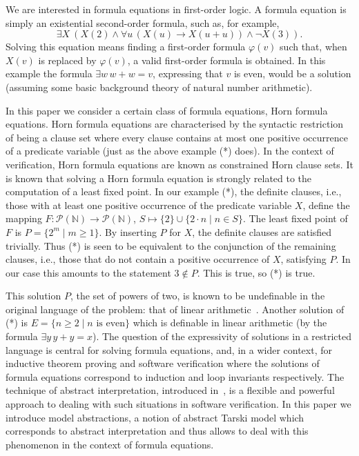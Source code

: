 \documentclass[acmsmall]{acmart}
\theoremstyle{plain}
\theoremstyle{definition}
\newcommand{\calC}{\mathcal{C}}
\renewcommand{\phi}{\varphi}
\newcommand{\Nat}{\mathbb{N}}
\newcommand{\powset}{\mathcal{P}}
\newcommand{\union}{\cup}
\newcommand{\impl}{\rightarrow} %
\begin{document}
We are interested in formula equations in first-order logic.
A formula equation is simply an existential second-order formula,
 such as, for example,
%
\begin{equation}\label{eq.runex}
\exists X\ ( X(2) \land \forall u\, (X(u) \impl X(u + u)) \land \neg X(3) ). \tag{*}
\end{equation}
%
Solving this equation means finding a first-order formula $\phi(v)$
 such that, when $X(v)$ is replaced by $\phi(v)$, a valid
 first-order formula is obtained.
In this example the formula $\exists w\, w+w = v$, expressing that
 $v$ is even, would be a solution (assuming some basic background theory of natural
 number arithmetic).

In this paper we consider a certain class of formula equations, Horn
 formula equations.
Horn formula equations are characterised by the syntactic restriction of
 being a clause set where every clause contains at most one positive
 occurrence of a predicate variable (just as the above example (*) does).
In the context of verification, Horn formula equations are known as constrained Horn clause sets.
It is known that solving a Horn formula equation is strongly related
 to the computation of a least fixed point.
In our example (*), the definite clauses, i.e., those with at least
 one positive occurrence of the predicate variable $X$, define the
 mapping $F:\powset(\Nat) \to \powset(\Nat)$,
 $S \mapsto \{ 2 \} \union \{ 2\cdot n \mid n \in S \}$.
The least fixed point of $F$ is $P = \{ 2^m \mid m \geq 1 \}$.
By inserting $P$ for $X$, the definite clauses are satisfied trivially.
Thus (*) is seen to be equivalent to the conjunction
 of the remaining clauses, i.e., those that do not contain a positive
 occurrence of $X$, satisfying $P$.
In our case this amounts to the statement $3 \notin P$.
This is true, so (*) is true.

This solution $P$, the set of powers of two, is known to be undefinable in
the original language of the problem: that of linear
 arithmetic~\cite{Enderton01Mathematical}.
Another solution of (*) is  $E = \{ n \geq 2 \mid \text{$n$ is even} \}$
 which is definable in linear arithmetic (by the formula $\exists y\, y + y = x$).
The question of the expressivity of solutions in a restricted language is central for
 solving formula equations, and, in a wider context, for inductive theorem proving
 and software verification where the solutions of formula equations correspond to
 induction and loop invariants respectively.
The technique of abstract interpretation, introduced in~\cite{Cousot77Abstract}, is a flexible
 and powerful approach to dealing with such situations in software verification.
In this paper we introduce model abstractions, a notion of abstract Tarski model which
 corresponds to abstract interpretation and thus allows to deal with this phenomenon
 in the context of formula equations.
\end{document}
